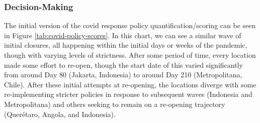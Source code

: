 %
%

\subsubsection{Decision-Making} \label{sec:vida-evdt-decision-results}

The initial version of the \ac{covid} response policy quantification/scoring can be seen in Figure \ref{tab:covid-policy-scores}. In this chart, we can see a similar wave of initial closures, all happening within the initial days or weeks of the pandemic, though with varying levels of strictness. After some period of time, every location made some effort to re-open, though the start date of this varied significantly from around Day 80 (Jakarta, Indonesia) to around Day 210 (Metropolitana, Chile). After these initial attempts at re-opening, the locations diverge with some re-implementing stricter policies in response to subsequent waves (Indonesia and Metropolitana) and others seeking to remain on a re-opening trajectory (Querétaro, Angola, and Indonesia).

